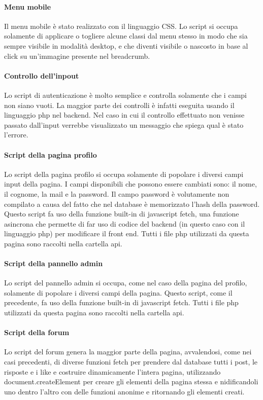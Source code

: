 \paragraph{Menu mobile}

Il menu mobile è stato realizzato con il linguaggio CSS. Lo script si occupa solamente di applicare o togliere alcune classi dal menu stesso in modo che sia sempre visibile in modalità desktop, e che diventi visibile o nascosto in base al click su un'immagine 
presente nel breadcrumb.

\paragraph{Controllo dell'inpout}

Lo script di autenticazione è molto semplice e controlla solamente che i campi non siano vuoti. La maggior parte dei controlli è infatti eseguita usando il linguaggio php nel backend. Nel caso in cui il controllo effettuato non venisse passato dall'input 
verrebbe visualizzato un messaggio che spiega qual è stato l'errore. 

\paragraph{Script della pagina profilo}

Lo script della pagina profilo si occupa solamente di popolare i diversi campi input della pagina. I campi disponibili che possono essere cambiati sono: il nome, il cognome, la mail e la password. Il campo password è volutamente non compilato a causa 
del fatto che nel database è memorizzato l'hash della password. Questo script fa uso della funzione built-in di javascript fetch, una funzione asincrona che permette di far uso di codice del backend (in questo caso con il linguaggio php) per modificare il 
front end. Tutti i file php utilizzati da questa pagina sono raccolti nella cartella api.

\paragraph{Script della pannello admin}

Lo script del pannello admin si occupa, come nel caso della pagina del profilo, solamente di popolare i diversi campi della pagina. Questo script, come il precedente, fa uso della funzione built-in di javascript fetch. 
Tutti i file php utilizzati da questa pagina sono raccolti nella cartella api.

\paragraph{Script della forum}

Lo script del forum genera la maggior parte della pagina, avvalendosi, come nei casi precedenti, di diverse funzioni fetch per prendere dal database tutti i post, le risposte e i like e costruire dinamicamente l'intera pagina, utilizzando document.createElement 
per creare gli elementi della pagina stessa e nidificandoli uno dentro l'altro con delle funzioni anonime e ritornando gli elementi creati. 


